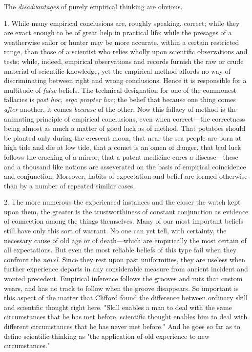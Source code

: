 \documentclass[letterpaper]{book}
\begin{document}
The \emph{disadvantages} of purely empirical thinking are
obvious.


1. While many empirical conclusions are, roughly speaking, correct;
while they are exact enough to be of great help in practical life; while
the presages of a weatherwise sailor or hunter may be more accurate,
within a certain restricted range, than those of a scientist who relies
wholly upon scientific observations and tests; while, indeed, empirical
observations and records furnish the raw or crude material of scientific
knowledge, yet the empirical method affords no way of discriminating
between right and wrong conclusions. Hence it is responsible for a
multitude of \emph{false} beliefs. The technical designation for one of
the commonest fallacies is \emph{post hoc, ergo propter hoc}; the belief
that because one thing comes \emph{after} another, it comes
\emph{because} of the other. Now this fallacy of method is the animating
principle of empirical conclusions, even when correct---the correctness
being almost as much a matter of good luck as of method. That potatoes
should be planted only during the crescent moon, that near the sea
people are born at high tide and die at low tide, that a comet is an
omen of danger, that bad luck follows the cracking of a mirror, that a
patent medicine cures a disease---these and a thousand like notions are
asseverated on the basis of empirical coincidence and conjunction.
Moreover, habits of expectation and belief are formed otherwise than by
a number of repeated similar cases.


2. The more numerous the experienced instances and the closer the watch
kept upon them, the greater is the trustworthiness of constant
conjunction as evidence of connection among the things themselves. Many
of our most important beliefs still have only this sort of warrant. No
one can yet tell, with certainty, the
necessary
cause of old age or of death---which are empirically the most certain of
all expectations. But even the most reliable beliefs of this type fail
when they confront the \emph{novel}. Since they rest upon past
uniformities, they are useless when further experience departs in any
considerable measure from ancient incident and wonted precedent.
Empirical inference follows the grooves and ruts that custom wears, and
has no track to follow when the groove disappears. So important is this
aspect of the matter that Clifford found the difference between ordinary
skill and scientific thought right here. "Skill enables a man to deal
with the same circumstances that he has met before, scientific thought
enables him to deal with different circumstances that he has never met
before." And he goes so far as to define scientific thinking as "the
application of old experience to new circumstances."
\end{document}

